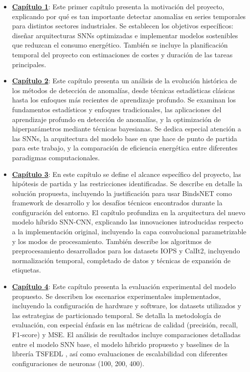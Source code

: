 \begin{itemize}
    \item\textbf{\hyperref[chap:introduccion]{Capítulo 1}}: Este primer capítulo presenta la motivación del proyecto, explicando por qué es tan importante detectar anomalías en series temporales para distintos sectores industriales. Se establecen los objetivos específicos: diseñar arquitecturas SNNs optimizadas e implementar modelos sostenibles que reduzcan el consumo energético. También se incluye la planificación temporal del proyecto con estimaciones de costes y duración de las tareas principales.
    
    \item\textbf{\hyperref[chap:fundamentos]{Capítulo 2}}: Este capítulo presenta un análisis de la evolución histórica de los métodos de detección de anomalías, desde técnicas estadísticas clásicas hasta los enfoques más recientes de aprendizaje profundo. Se examinan los fundamentos estadísticos y enfoques tradicionales, las aplicaciones del aprendizaje profundo en detección de anomalías, y la optimización de hiperparámetros mediante técnicas bayesianas. Se dedica especial atención a las SNNs, la arquitectura del modelo base en que hace de punto de partida para este trabajo, y la comparación de eficiencia energética entre diferentes paradigmas computacionales.
    
    \item\textbf{\hyperref[chap:especificacion]{Capítulo 3}}: En este capítulo se define el alcance específico del proyecto, las hipótesis de partida y las restricciones identificadas. Se describe en detalle la solución propuesta, incluyendo la justificación para usar BindsNET como framework de desarrollo y los desafíos técnicos encontrados durante la configuración del entorno. El capítulo profundiza en la arquitectura del nuevo modelo híbrido SNN-CNN, explicando las innovaciones introducidas respecto a la implementación original, incluyendo la capa convolucional parametrizable y los modos de procesamiento. También describe los algoritmos de preprocesamiento desarrollados para los datasets IOPS y CalIt2, incluyendo normalización temporal, completado de datos y técnicas de expansión de etiquetas.
    
    \item\textbf{\hyperref[chap:resultados]{Capítulo 4}}: Este capítulo presenta la evaluación experimental del modelo propuesto. Se describen los escenarios experimentales implementados, incluyendo la configuración de hardware y software, los datasets utilizados y las estrategias de particionado temporal. Se detalla la metodología de evaluación, con especial énfasis en las métricas de calidad (precisión, recall, F1-score) y MSE. El análisis de resultados incluye comparaciones detalladas entre el modelo SNN base, el modelo híbrido propuesto y baselines de la librería TSFEDL \cite{AGUILERAMARTOS2023223}, así como evaluaciones de escalabilidad con diferentes configuraciones de neuronas (100, 200, 400).
    

\end{itemize}

